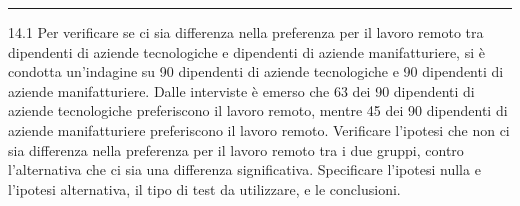 \documentclass[
  11pt,
]{book}
\theoremstyle{mytheoremstyle}
\theoremstyle{mydefstyle}
\begin{document}
\begin{center}\rule{0.5\linewidth}{0.5pt}\end{center}

14.1 Per verificare se ci sia differenza nella preferenza per il lavoro remoto tra dipendenti di aziende tecnologiche e dipendenti di aziende manifatturiere, si è condotta un'indagine su 90 dipendenti di aziende tecnologiche e 90 dipendenti di aziende manifatturiere. Dalle interviste è emerso che 63 dei 90 dipendenti di aziende tecnologiche preferiscono il lavoro remoto, mentre 45 dei 90 dipendenti di aziende manifatturiere preferiscono il lavoro remoto. Verificare l'ipotesi che non ci sia differenza nella preferenza per il lavoro remoto tra i due gruppi, contro l'alternativa che ci sia una differenza significativa. Specificare l'ipotesi nulla e l'ipotesi alternativa, il tipo di test da utilizzare, e le conclusioni.
\end{document}
